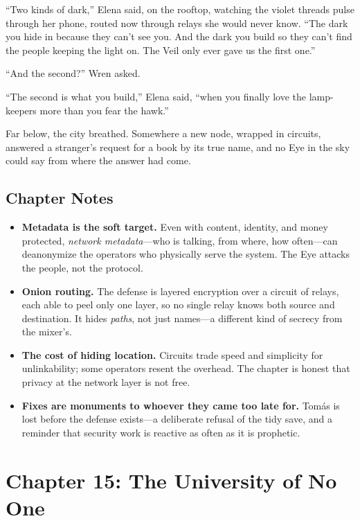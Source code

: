 \documentclass[12pt,letterpaper]{book}
\providecommand{\tightlist}{\setlength{\itemsep}{0pt}\setlength{\parskip}{0pt}}
\begin{document}
``Two kinds of dark,'' Elena said, on the rooftop, watching the violet threads
pulse through her phone, routed now through relays she would never know. ``The
dark you hide in because they can't see you. And the dark you build so they can't
find the people keeping the light on. The Veil only ever gave us the first one.''

``And the second?'' Wren asked.

``The second is what you build,'' Elena said, ``when you finally love the
lamp-keepers more than you fear the hawk.''

Far below, the city breathed. Somewhere a new node, wrapped in circuits, answered
a stranger's request for a book by its true name, and no Eye in the sky could say
from where the answer had come.

\hypertarget{chapter-14-notes}{%
\subsection{Chapter Notes}\label{chapter-14-notes}}

\begin{itemize}
\tightlist
\item
  \textbf{Metadata is the soft target.} Even with content, identity, and money
  protected, \emph{network metadata}---who is talking, from where, how often---can
  deanonymize the operators who physically serve the system. The Eye attacks the
  people, not the protocol.
\item
  \textbf{Onion routing.} The defense is layered encryption over a circuit of
  relays, each able to peel only one layer, so no single relay knows both source
  and destination. It hides \emph{paths}, not just names---a different kind of
  secrecy from the mixer's.
\item
  \textbf{The cost of hiding location.} Circuits trade speed and simplicity for
  unlinkability; some operators resent the overhead. The chapter is honest that
  privacy at the network layer is not free.
\item
  \textbf{Fixes are monuments to whoever they came too late for.} Tomás is lost
  before the defense exists---a deliberate refusal of the tidy save, and a
  reminder that security work is reactive as often as it is prophetic.
\end{itemize}


\hypertarget{chapter-15-the-university-of-no-one}{%
\section{Chapter 15: The University of No
One}\label{chapter-15-the-university-of-no-one}}
\end{document}
